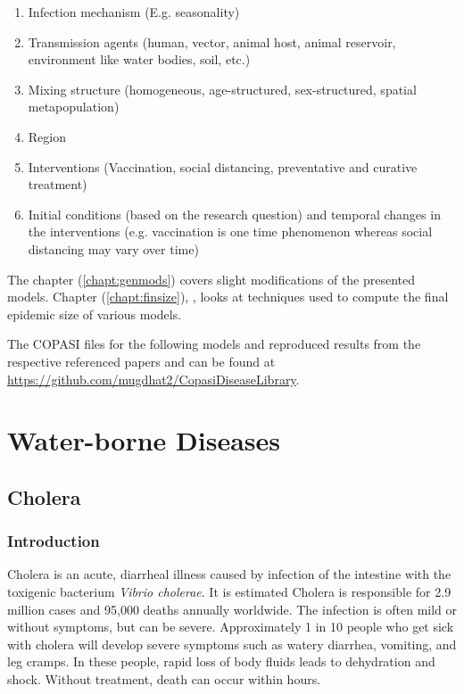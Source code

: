 \documentclass{book}\usepackage[]{graphicx}\usepackage[]{color}
\begin{document}
\begin{enumerate}
    \item Infection mechanism (E.g. seasonality)
    \item Transmission agents (human, vector, animal host, animal reservoir, environment like water bodies, soil, etc.)
    \item Mixing structure (homogeneous, age-structured, sex-structured, spatial metapopulation)
    \item Region
    \item Interventions (Vaccination, social distancing, preventative and curative treatment)
    \item Initial conditions (based on the research question) and temporal changes in the interventions (e.g. vaccination is one time phenomenon whereas social distancing may vary over time)
\end{enumerate}

The  chapter (\ref{chapt:genmods}) covers slight modifications of the presented models. Chapter (\ref{chapt:finsize}), , looks at techniques used to compute the final epidemic size of various models. 


The COPASI files for the following models and reproduced results from the respective referenced papers and can be found at \url{https://github.com/mugdhat2/CopasiDiseaseLibrary}.


\chapter{Water-borne Diseases}
\label{chapt:waterborne}

\section{Cholera}
\subsection*{Introduction}
Cholera is an acute, diarrheal illness caused by infection of the intestine with the toxigenic bacterium {\it Vibrio cholerae}. It is estimated Cholera is responsible for 2.9 million cases and 95,000 deaths annually worldwide. The infection is often mild or without symptoms, but can be severe. Approximately 1 in 10 people who get sick with cholera will develop severe symptoms such as watery diarrhea, vomiting, and leg cramps. In these people, rapid loss of body fluids leads to dehydration and shock. Without treatment, death can occur within hours.
\end{document}
